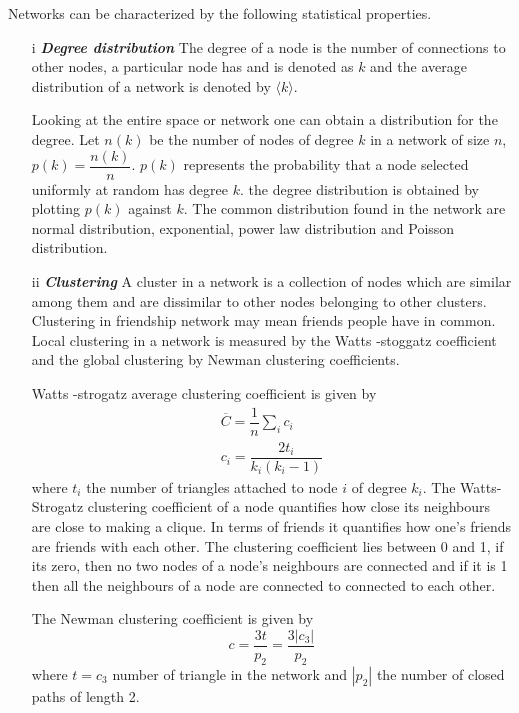 Networks can be characterized by the following statistical properties.
 \begin{itemize}
 \item[i] \textit{\textbf{Degree distribution}}
   The degree of a node is the number of connections to other nodes, a particular node has and is denoted as $k$ and the average distribution
   of a network is denoted by $\langle k \rangle$.

   Looking at the entire space or network one can obtain a distribution for the degree. Let $n (k) $ be the number of nodes of degree $k$ in a network of size $n$, $p (k) = \dfrac{n(k)}{n}$. $p (k) $ represents the probability that a node selected uniformly at random has degree $k$. the degree distribution is obtained by plotting $p (k) $ against $k$\citep{estrada2015first}.
   The common distribution found in the network are normal distribution, exponential, power law distribution and Poisson distribution\citep{chung2002average}.

 \item[ii] \textit{\textbf{Clustering }}
   A cluster in a network  is a collection of nodes which are similar among them and are dissimilar to other nodes belonging to other clusters. Clustering in friendship network may
   mean
   friends people have in common. Local clustering in a network is measured by   the Watts -stoggatz
   coefficient and the global clustering by  Newman clustering coefficients.
 
 Watts -strogatz average clustering coefficient is given by 
 \begin{align}
 \overline{C} = \dfrac{1}{n} \sum_i c_i
  \\ c_i = \dfrac{2t_i}{k_i(k_i-1)} \nonumber
  \end{align}
   where $t_i $ the number of triangles attached to node $i$ of degree $k_i$. The Watts-Strogatz clustering coefficient of a node quantifies how close its neighbours are close to making a clique. In terms of friends it quantifies how one's friends are friends with each other. The clustering coefficient lies between 0 and 1, if its zero, then no two nodes of a node's neighbours are connected and if it is 1 then all the neighbours of a node are connected to connected to each other.
  

 The Newman clustering coefficient is given by
 \begin{equation}
 c = \frac{3t}{p_2} =\dfrac{3|c_3|}{p_2}
 \end{equation}
 where $t = c_3$ number of triangle in the network and $|p_2|$ the number of closed paths of length 2. 
\end{itemize}

